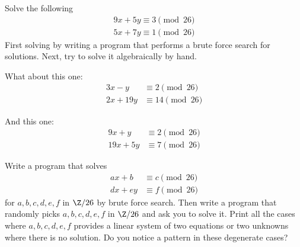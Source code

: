 \mbox{}
  \begin{myenum}
    \item
      Solve the following
      \begin{align*}
        9x + 5y \equiv 3 \pmod{26} \\
        5x + 7y \equiv 1 \pmod{26}
      \end{align*}
      First solving by writing a program that performs a brute force search for solutions.
      Next, try to solve it algebraically by hand.
    \item What about this one:
      \begin{align*}
        3x - y &\equiv 2 \pmod{26} \\
        2x + 19y &\equiv 14 \pmod{26}
      \end{align*}
    \item And this one:
      \begin{align*}
        9x + y &\equiv 2 \pmod{26} \\
        19x + 5y &\equiv 7 \pmod{26}
      \end{align*}

    \item Write a program that solves
      \begin{align*}
        ax + b &\equiv c \pmod{26} \\
        dx + ey &\equiv f \pmod{26}
      \end{align*}
      for $a,b,c,d,e,f$ in $\Z/26$ by brute force search.
      Then write a program that randomly
      picks $a,b,c,d,e,f$ in $\Z/26$ and ask you to solve it.
      Print all the cases where $a,b,c,d,e,f$ provides a linear system of
      two equations or two unknowns where there is no solution.
      Do you notice a pattern in these degenerate cases?
\end{myenum}
